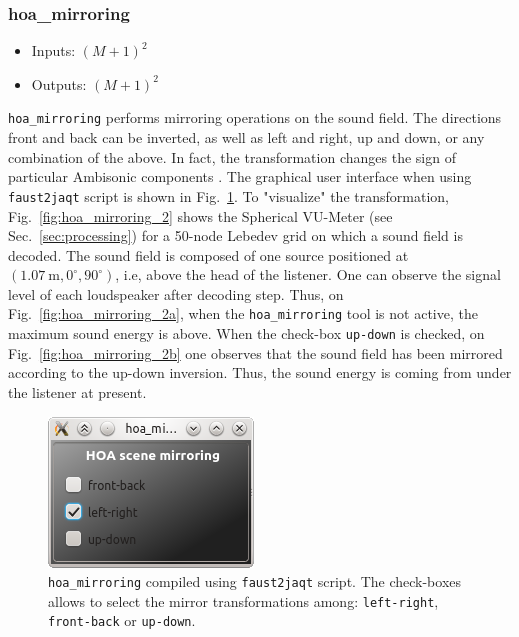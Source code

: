 \documentclass[10pt,a4paper]{article}
\begin{document}
\subsubsection{hoa\_mirroring}
\begin{itemize}
\item Inputs: $(M+1)^2$
\item Outputs: $(M+1)^2$
\end{itemize}
\lstinline'hoa_mirroring' performs mirroring operations on the sound field. The directions front and back can be inverted, as well as left and right, up and down, or any combination of the above. In fact, the transformation changes the sign of particular Ambisonic components \cite{kronlachner2014spatial}. The graphical user interface when using \lstinline'faust2jaqt' script is shown in Fig.~\ref{fig:hoa_mirroring}. To "visualize" the transformation, Fig.~\ref{fig:hoa_mirroring_2} shows the Spherical VU-Meter (see Sec.~\ref{sec:processing}) for a 50-node Lebedev grid on which a sound field is decoded. The sound field is composed of one source positioned at $(1.07~\text{m}, 0^\circ, 90^\circ)$, i.e, above the head of the listener. One can observe the signal level of each loudspeaker after decoding step. Thus, on Fig.~\ref{fig:hoa_mirroring_2a}, when the \lstinline'hoa_mirroring' tool is not active, the maximum sound energy is above. When the check-box \lstinline'up-down' is checked, on Fig.~\ref{fig:hoa_mirroring_2b} one observes that the sound field has been mirrored according to the up-down inversion. Thus, the sound energy is coming from under the listener at present.
\begin{figure}[!ht]
\centering
\includegraphics[width=0.3\columnwidth]{hoa_mirroring.png}
\caption{\lstinline'hoa_mirroring' compiled using \lstinline'faust2jaqt' script. The check-boxes allows to select the mirror transformations among: \lstinline'left-right', \lstinline'front-back' or \lstinline'up-down'.}
\label{fig:hoa_mirroring}
\end{figure}
\end{document}
